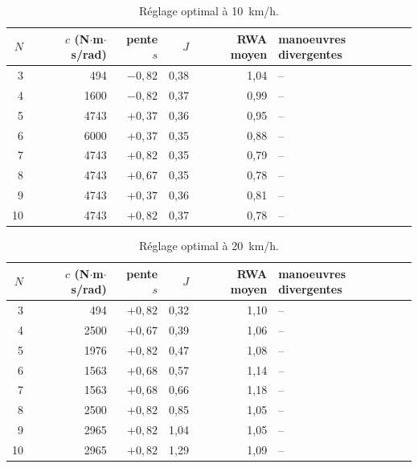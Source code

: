 \begin{table}[ht]\centering\small
\begin{tabular}{@{}r r r r r l@{}}\toprule
$N$ & $c$ (N$\cdot$m$\cdot$s/rad) & pente $s$ & $J$ & RWA moyen & manoeuvres divergentes\\\midrule
3 & 494 & $-0{,}82$ & 0{,}38 & 1{,}04 & --\\
4 & 1600 & $-0{,}82$ & 0{,}37 & 0{,}99 & --\\
5 & 4743 & $+0{,}37$ & 0{,}36 & 0{,}95 & --\\
6 & 6000 & $+0{,}37$ & 0{,}35 & 0{,}88 & --\\
7 & 4743 & $+0{,}82$ & 0{,}35 & 0{,}79 & --\\
8 & 4743 & $+0{,}67$ & 0{,}35 & 0{,}78 & --\\
9 & 4743 & $+0{,}37$ & 0{,}36 & 0{,}81 & --\\
10 & 4743 & $+0{,}82$ & 0{,}37 & 0{,}78 & --\\
\bottomrule\end{tabular}
\caption{Réglage optimal à \SI{10}{km/h}.}\label{tab:opt10}\end{table}

\begin{table}[ht]\centering\small
\begin{tabular}{@{}r r r r r l@{}}\toprule
$N$ & $c$ (N$\cdot$m$\cdot$s/rad) & pente $s$ & $J$ & RWA moyen & manoeuvres divergentes\\\midrule
3 & 494 & $+0{,}82$ & 0{,}32 & 1{,}10 & --\\
4 & 2500 & $+0{,}67$ & 0{,}39 & 1{,}06 & --\\
5 & 1976 & $+0{,}82$ & 0{,}47 & 1{,}08 & --\\
6 & 1563 & $+0{,}68$ & 0{,}57 & 1{,}14 & --\\
7 & 1563 & $+0{,}68$ & 0{,}66 & 1{,}18 & --\\
8 & 2500 & $+0{,}82$ & 0{,}85 & 1{,}05 & --\\
9 & 2965 & $+0{,}82$ & 1{,}04 & 1{,}05 & --\\
10 & 2965 & $+0{,}82$ & 1{,}29 & 1{,}09 & --\\
\bottomrule\end{tabular}
\caption{Réglage optimal à \SI{20}{km/h}.}\label{tab:opt20}\end{table}

